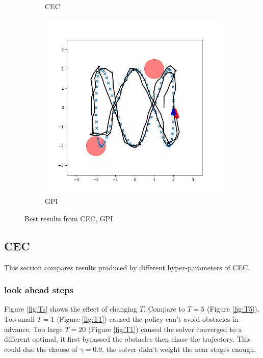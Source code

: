 \documentclass[conference]{IEEEtran}
\begin{document}
\begin{figure}
\begin{subfigure}[b]{0.3\textwidth}
        \caption{CEC}
        \label{fig:cec}
    \end{subfigure}
    \hfill
    \begin{subfigure}[b]{0.3\textwidth}
        \includegraphics[width=\textwidth]{../fig/trajectory.gpi.png}
        \caption{GPI}
        \label{fig:gpi}
    \end{subfigure}
    \caption{Best results from CEC, GPI}
    \label{fig:best}
\end{figure}

\subsection{CEC}
This section compares results produced by different hyper-parameters of CEC.

\subsubsection{look ahead steps}
Figure \ref{fig:Ts} shows the effect of changing $T$.
Compare to $T=5$ (Figure \ref{fig:T5}),
Too small $T=1$ (Figure \ref{fig:T1}) caused the policy can't avoid obstacles in advance.
Too large $T=20$ (Figure \ref{fig:T1}) caused the solver converged to a different optimal, 
it first bypassed the obstacles then chase the trajectory. 
This could due the choose of $\gamma = 0.9$, 
the solver didn't weight the near stages enough.
\end{document}
